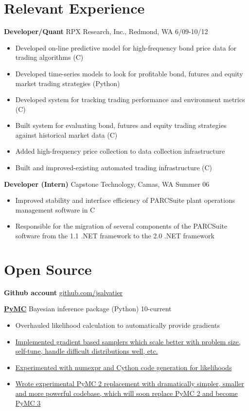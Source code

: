 \documentclass[margin]{res}
\newcommand{\bactivity}[3]{
  {\bf #1} #2 \hfill #3
    \vspace{6pt}
    \begin{itemize} \itemsep -2pt
      }
\newcommand{\eactivity}[0]{\end{itemize}}
\newcommand{\CS}
{C\nolinebreak[4]\hspace{-.05em}\raisebox{.22ex}{\footnotesize\bf \#}}
\begin{document}
 
 
\begin{resume} 
 

\section{Relevant Experience}
  \bactivity{Developer/Quant}{RPX Research, Inc., Redmond, WA}{6/09-10/12}
     \item Developed on-line predictive model for high-frequency bond price data for trading algorithms (\CS)
     \item Developed time-series models to look for profitable bond, futures and equity market trading strategies (Python) 
     \item Developed system for tracking trading performance and environment metrics (\CS)
     \item Built system for evaluating bond, futures and equity trading strategies against historical market data (\CS) 
     \item Added high-frequency price collection to data collection infrastructure
     \item Built and improved-existing automated trading infrastructure (\CS)
  \eactivity

    \bactivity{Developer (Intern)}{Capstone Technology, Camas, WA}{Summer 06}
    \item Improved stability and interface efficiency of PARCSuite plant operations management software in \CS\
    \item Responsible for the migration of several components of the PARCSuite software from the 1.1 .NET framework to the 2.0 .NET framework 
  \eactivity

 \section{Open Source}
 {\bf Github account} \href{https://github.com/jsalvatier}{github.com/jsalvatier}

    \bactivity{\href{https://github.com/pymc-devs/pymc\#readme}{PyMC}}{Bayesian inference package (Python)}{10-current}
      \item Overhauled likelihood calculation to automatically provide gradients 
      \item {\href{https://github.com/jsalvatier/gradient\_samplers/blob/master/gradient\_samplers}{Implemented gradient based samplers which scale better with problem size, self-tune, handle difficult distributions well, etc.}}
      \item {\href{https://github.com/pymc-devs/pymc/commits/numexpr\_dist}{Experimented with numexpr and Cython code generation for likelihoods}}
      \item {\href{https://github.com/pymc-devs/pymc/commits/pymc3}{Wrote experimental PyMC 2 replacement with dramatically simpler, smaller and more powerful codebase, which will soon replace PyMC 2 and become PyMC 3}}
    \eactivity


\end{resume}
\end{document}
